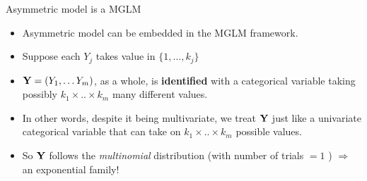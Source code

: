 \documentclass{beamer}
\newenvironment{wideitemize}%
  {\begin{itemize}%
    \setlength{\parskip}{1em}}%
  {\end{itemize}}
\begin{document}
\begin{frame} {Asymmetric model is a MGLM}
\begin{wideitemize}
\item Asymmetric model can be  embedded in the MGLM framework.
\item Suppose each $Y_j$ takes value in $ \{1, \dots, k_j\}$
\item
 ${\bf Y} = (Y_1, \dots Y_m)$, as a whole, is {\bf identified} with a categorical variable taking possibly $k_1 \times .. \times  k_m$ many different values. 
 
 \item In other words, despite it being multivariate, we treat ${\bf Y}$ just like a univariate categorical variable that can take on $k_1 \times .. \times  k_m$ possible values.
 
 \item So ${\bf Y}$ follows the \emph{multinomial} distribution  (with number of trials $ = 1$ )  $\Rightarrow$ an exponential family!
 


\end{wideitemize}
\end{frame}

%
%
% 
% 
% 
%
%
%
%
\end{document}
